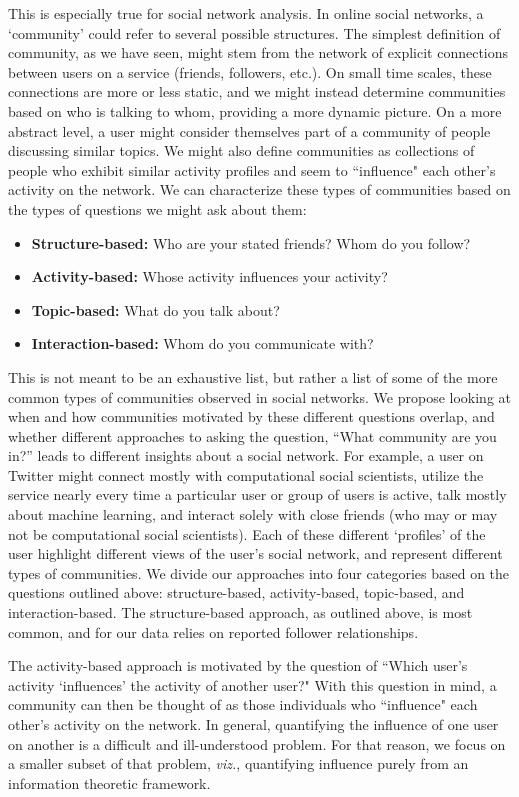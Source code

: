 This is especially true for social network analysis. In online social networks, a `community' could refer to several possible structures. The simplest definition of community, as we have seen, might stem from the network of explicit connections between users on a service (friends, followers, etc.). On small time scales, these connections are more or less static, and we might instead determine communities based on who is talking to whom, providing a more dynamic picture. On a more abstract level, a user might consider themselves part of a community of people discussing similar topics. We might also define communities as collections of people who exhibit similar activity profiles and seem to ``influence" each other's activity on the network. We can characterize these types of communities based on the types of questions we might ask about them:
\begin{itemize}
	\item \textbf{Structure-based:} Who are your stated friends? Whom do you follow?
	\item \textbf{Activity-based:} Whose activity influences your activity?
	\item \textbf{Topic-based:} What do you talk about?
	\item \textbf{Interaction-based:} Whom do you communicate with?
\end{itemize}

This is not meant to be an exhaustive list, but rather a list of some of the more common types of communities observed in social networks. We propose looking at when and how communities motivated by these different questions overlap, and whether different approaches to asking the question, ``What community are you in?'' leads to different insights about a social network. For example, a user on Twitter might connect mostly with computational social scientists, utilize the service nearly every time a particular user or group of users is active, talk mostly about machine learning, and interact solely with close friends (who may or may not be computational social scientists). Each of these different `profiles' of the user highlight different views of the user's social network, and represent different types of communities. We divide our approaches into four categories based on the questions outlined above: structure-based, activity-based, topic-based, and interaction-based. The structure-based approach, as outlined above, is most common, and for our data relies on reported follower relationships.

The activity-based approach is motivated by the question of ``Which user's activity `influences' the activity of another user?" %
 With this question in mind, a community can then be thought of as those individuals who ``influence" each other's activity on the network. In general, quantifying the influence of one user on another is a difficult and ill-understood problem. For that reason, we focus on a smaller subset of that problem, \emph{viz.}, quantifying influence purely from an information theoretic framework.

